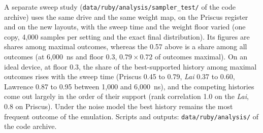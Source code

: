 \documentclass[11pt,a4paper]{article}
\theoremstyle{remark}
\begin{document}
A separate sweep study (\texttt{data/ruby/analysis/sampler\_test/} of the code archive) uses the same drive and the same weight map, on the Priscus register and on the new layouts, with the sweep time and the weight floor varied (one copy, 4{,}000 samples per setting and the exact final distribution). Its figures are shares among maximal outcomes, whereas the 0.57 above is a share among all outcomes (at 6{,}000~ns and floor 0.3, $0.79\times0.72$ of outcomes maximal). On an ideal device, at floor 0.3, the share of the best-supported history among maximal outcomes rises with the sweep time (Priscus 0.45 to 0.79, \emph{Lai} 0.37 to 0.60, Lawrence 0.87 to 0.95 between 1{,}000 and 6{,}000~ns), and the competing histories come out largely in the order of their support (rank correlation 1.0 on the \emph{Lai}, 0.8 on Priscus). Under the noise model the best history remains the most frequent outcome of the emulation. Scripts and outputs: \texttt{data/ruby/analysis/} of the code archive.


\nocite{MCPassional}

\end{document}
